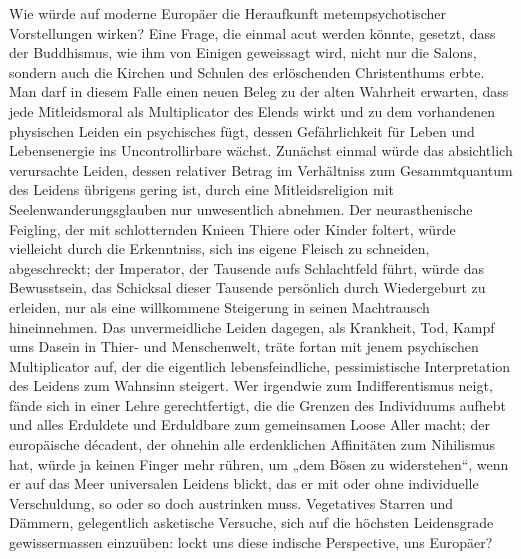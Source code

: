 Wie würde auf moderne Europäer die Heraufkunft metempsychotischer Vorstellungen wirken? Eine Frage, die einmal acut werden könnte, gesetzt, dass der Buddhismus, wie ihm von Einigen geweissagt wird, nicht nur die Salons, sondern auch die Kirchen und Schulen des erlöschenden Christenthums erbte. Man darf in diesem Falle einen neuen Beleg zu der alten Wahrheit erwarten, dass jede Mitleidsmoral als Multiplicator des Elends wirkt und zu dem vorhandenen physischen Leiden ein psychisches fügt, dessen Gefährlichkeit für Leben und Lebensenergie ins Uncontrollirbare wächst. Zunächst einmal würde das absichtlich verursachte Leiden, dessen relativer Betrag im Verhältniss zum Gesammtquantum des Leidens übrigens gering ist, durch eine Mitleidsreligion mit Seelenwanderungsglauben nur unwesentlich abnehmen. Der neurasthenische Feigling, der mit schlotternden Knieen Thiere oder Kinder foltert, würde vielleicht durch die Erkenntniss, sich ins eigene Fleisch zu schneiden, abgeschreckt; der Imperator, der Tausende aufs Schlachtfeld führt, würde das Bewusstsein, das Schicksal dieser Tausende persönlich durch Wiedergeburt zu erleiden, nur als eine willkommene Steigerung in seinen Machtrausch hineinnehmen. Das unvermeidliche Leiden dagegen, als Krankheit, Tod, Kampf ums Dasein in Thier- und Menschenwelt, träte fortan mit jenem psychischen Multiplicator auf, der die eigentlich lebensfeindliche, pessimistische Interpretation des Leidens zum Wahnsinn steigert. Wer irgendwie zum Indifferentismus neigt, fände sich in einer Lehre gerechtfertigt, die die Grenzen des Individuums aufhebt und alles Erduldete und Erduldbare zum gemeinsamen Loose Aller macht; der europäische décadent, der ohnehin alle erdenklichen Affinitäten zum Nihilismus hat, würde ja keinen Finger mehr rühren, um „dem Bösen zu widerstehen“, wenn er auf das Meer universalen Leidens blickt, das er mit oder ohne individuelle Verschuldung, so oder so doch austrinken muss. Vegetatives Starren und Dämmern, gelegentlich asketische Versuche, sich auf die höchsten Leidensgrade gewissermassen einzuüben: lockt uns diese indische Perspective, uns Europäer?
\par

